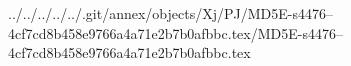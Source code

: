 ../../../../../.git/annex/objects/Xj/PJ/MD5E-s4476--4cf7cd8b458e9766a4a71e2b7b0afbbc.tex/MD5E-s4476--4cf7cd8b458e9766a4a71e2b7b0afbbc.tex